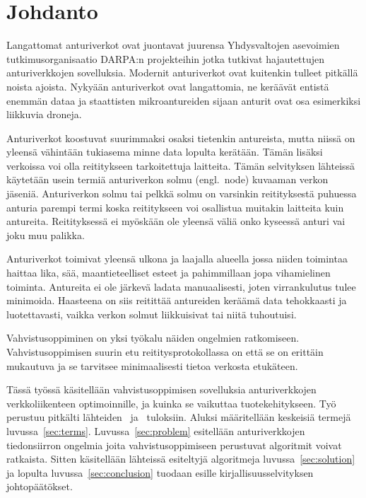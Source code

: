 \section{Johdanto}
Langattomat anturiverkot ovat juontavat juurensa Yhdysvaltojen asevoimien
tutkimusorganisaatio DARPA:n projekteihin jotka tutkivat hajautettujen
anturiverkkojen sovelluksia. Modernit anturiverkot ovat kuitenkin tulleet
pitkällä noista ajoista. Nykyään anturiverkot ovat langattomia, ne keräävät
entistä enemmän dataa ja staattisten mikroantureiden sijaan anturit ovat osa
esimerkiksi liikkuvia droneja.

Anturiverkot koostuvat suurimmaksi osaksi tietenkin antureista, mutta niissä on
yleensä vähintään tukiasema minne data lopulta kerätään. Tämän lisäksi
verkoissa voi olla reititykseen tarkoitettuja laitteita.  Tämän selvityksen
lähteissä käytetään usein termiä anturiverkon solmu (engl.\ node) kuvaaman
verkon jäseniä.  Anturiverkon solmu tai pelkkä solmu on varsinkin reitityksestä
puhuessa anturia parempi termi koska reititykseen voi osallistua muitakin
laitteita kuin antureita. Reitityksessä ei myöskään ole yleensä väliä onko
kyseessä anturi vai joku muu palikka.

Anturiverkot toimivat yleensä ulkona ja laajalla alueella jossa niiden
toimintaa haittaa lika, sää, maantieteelliset esteet ja pahimmillaan jopa
vihamielinen toiminta. Antureita ei ole järkevä ladata manuaalisesti, joten
virrankulutus tulee minimoida. Haasteena on siis reitittää antureiden keräämä
data tehokkaasti ja luotettavasti, vaikka verkon solmut liikkuisivat tai niitä
tuhoutuisi.

Vahvistusoppiminen on yksi työkalu näiden ongelmien ratkomiseen.
Vahvistusoppimisen suurin etu reititysprotokollassa on että se on erittäin
mukautuva ja se tarvitsee minimaalisesti tietoa verkosta etukäteen.

Tässä työssä käsitellään vahvistusoppimisen sovelluksia anturiverkkojen
verkkoliikenteen optimoinnille, ja kuinka se vaikuttaa tuotekehitykseen. Työ
perustuu pitkälti lähteiden~\cite{Arya2015} ja~\cite{Yu2006} tuloksiin. Aluksi
määritellään keskeisiä termejä luvussa~\ref{sec:terms}.
Luvussa~\ref{sec:problem} esitellään anturiverkkojen tiedonsiirron ongelmia
joita vahvistusoppimiseen perustuvat algoritmit voivat ratkaista. Sitten
käsitellään lähteissä esiteltyjä algoritmeja luvussa~\ref{sec:solution} ja
lopulta luvussa~\ref{sec:conclusion} tuodaan esille kirjallisuusselvityksen
johtopäätökset.
